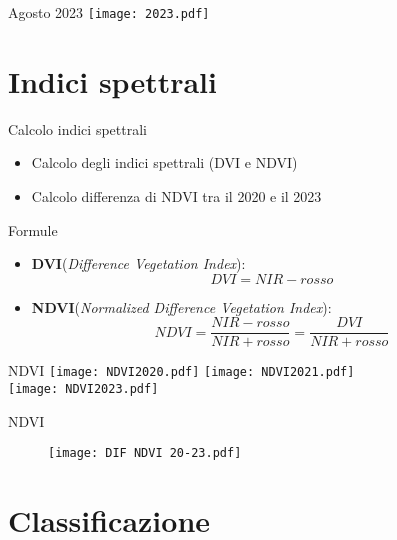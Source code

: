 \documentclass{beamer}
\begin{document}
\begin{frame}{Agosto 2023}
\centering
\texttt{[image: 2023.pdf]}
\end{frame}

\section{Indici spettrali}

\begin{frame}{Calcolo indici spettrali}
\begin{itemize}
    \item Calcolo degli indici spettrali (DVI e NDVI)
    \item \pause Calcolo differenza di NDVI tra il 2020 e il 2023
\end{itemize}
    
\end{frame}

\begin{frame}{Formule}
    \begin{itemize}
    \item  \textbf{DVI}(\textit{Difference Vegetation Index}):
    \begin{equation}
        DVI = NIR - rosso
    \end{equation}
    \item \textbf{NDVI}(\textit{Normalized Difference Vegetation Index}):
    \begin{equation}
        NDVI = \frac{NIR - rosso}{NIR + rosso} = \frac{DVI}{NIR + rosso}
    \end{equation}
\end{itemize}
\end{frame}

\begin{frame}{NDVI}
\centering
\texttt{[image: NDVI2020.pdf]}
\texttt{[image: NDVI2021.pdf]}\\
\texttt{[image: NDVI2023.pdf]}
\end{frame}

\begin{frame}{NDVI}
\begin{figure}
    \centering
    \texttt{[image: DIF NDVI 20-23.pdf]}
    \end{figure}
\end{frame}

\section{Classificazione}
\end{document}
